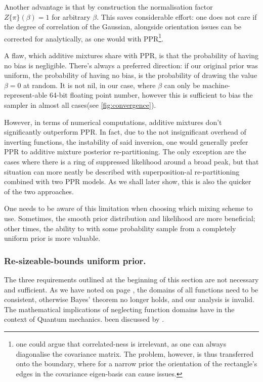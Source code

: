 \documentclass[usenatbib]{mnras}
\begin{document}
Another advantage is that by construction the normalisation factor
\(Z \{ \pi\}(\beta) = 1\) for arbitrary \(\beta\). This saves
considerable effort: one does not care if the degree of
correlation of the Gaussian, alongside orientation issues can be
corrected for analytically, as one would with PPR\footnote{one could
argue that correlated-ness is irrelevant, as one can always
diagonalise the covariance matrix. The problem, however, is thus
transferred onto the boundary, where for a narrow prior the
orientation of the rectangle's edges in the covariance eigen-basis
can cause issues.}. 


A flaw, which additive mixtures share with PPR, is that the
probability of having no bias is negligible. There's always a
preferred direction: if our original prior was uniform, the
probability of having no bias, is the probability of drawing the
value \(\beta=0\) at random. It is not nil, in our case, where
\(\beta\) can only be machine-represent-able 64-bit floating point
number, however this is sufficient to bias the sampler in almost
all cases(see \autoref{fig:convergence}). 

However, in terms of numerical computations, additive mixtures
don't significantly outperform PPR. In fact, due to the not
insignificant overhead of inverting functions, the instability of
said inversion, one would generally prefer PPR to additive mixture
posterior re-partitioning. The only exception are the cases where
there is a ring of suppressed likelihood around a broad peak, but
that situation can more neatly be described with superposition-al
re-partitioning combined with two PPR models. As we shall later
show, this is also the quicker of the two approaches.

One needs to be aware of this limitation when choosing which
mixing scheme to use. Sometimes, the smooth prior distribution and
likelihood are more beneficial; other times, the ability to with
some probability sample from a completely uniform prior is more
valuable. 



\subsubsection{Re-sizeable-bounds uniform prior.}
\label{sec:org0454701}

The three requirements outlined at the beginning of this section
are not necessary and sufficient. As we have noted on page
\pageref{domain-discussion}, the domains of all functions need to be
consistent, otherwise Bayes' theorem no longer holds, and our
analysis is invalid. The mathematical implications of neglecting
function domains have in the context of Quantum mechanics. been
discussed by \cite{Gieres_2000}.
\end{document}
